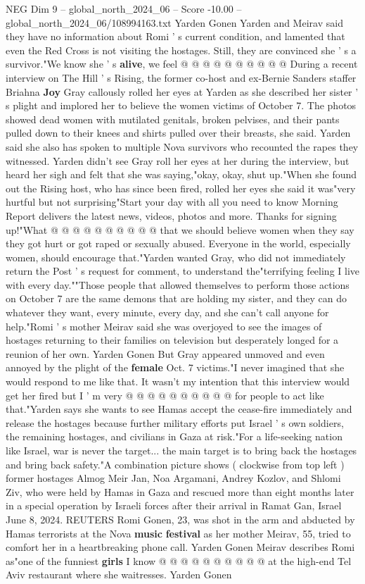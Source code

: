 \begin{textsample}{NEG Dim 9 – global\_north\_2024\_06 – Score -10.00 – global\_north\_2024\_06/108994163.txt}
Yarden Gonen Yarden and Meirav said they have no information about Romi ' s current condition, and lamented that even the Red Cross is not visiting the hostages.
Still, they are convinced she ' s a survivor."We know she ' s \textbf{alive}, we feel @ @ @ @ @ @ @ @ @ @ During a recent interview on The Hill ' s Rising, the former co-host and ex-Bernie Sanders staffer Briahna \textbf{Joy} Gray callously rolled her eyes at Yarden as she described her sister ' s plight and implored her to believe the women victims of October 7.
The photos showed dead women with mutilated genitals, broken pelvises, and their pants pulled down to their knees and shirts pulled over their breasts, she said.
Yarden said she also has spoken to multiple Nova survivors who recounted the rapes they witnessed.
Yarden didn't see Gray roll her eyes at her during the interview, but heard her sigh and felt that she was saying,"okay, okay, shut up."When she found out the Rising host, who has since been fired, rolled her eyes she said it was"very hurtful but not surprising"Start your day with all you need to know Morning Report delivers the latest news, videos, photos and more.
Thanks for signing up!"What @ @ @ @ @ @ @ @ @ @ that we should believe women when they say they got hurt or got raped or sexually abused.
Everyone in the world, especially women, should encourage that."Yarden wanted Gray, who did not immediately return the Post ' s request for comment, to understand the"terrifying feeling I live with every day.""Those people that allowed themselves to perform those actions on October 7 are the same demons that are holding my sister, and they can do whatever they want, every minute, every day, and she can't call anyone for help."Romi ' s mother Meirav said she was overjoyed to see the images of hostages returning to their families on television but desperately longed for a reunion of her own.
Yarden Gonen But Gray appeared unmoved and even annoyed by the plight of the \textbf{female} Oct. 7 victims."I never imagined that she would respond to me like that.
It wasn't my intention that this interview would get her fired but I ' m very @ @ @ @ @ @ @ @ @ @ for people to act like that."Yarden says she wants to see Hamas accept the cease-fire immediately and release the hostages because further military efforts put Israel ' s own soldiers, the remaining hostages, and civilians in Gaza at risk."For a life-seeking nation like Israel, war is never the target... the main target is to bring back the hostages and bring back safety."A combination picture shows ( clockwise from top left ) former hostages Almog Meir Jan, Noa Argamani, Andrey Kozlov, and Shlomi Ziv, who were held by Hamas in Gaza and rescued more than eight months later in a special operation by Israeli forces after their arrival in Ramat Gan, Israel June 8, 2024.
REUTERS Romi Gonen, 23, was shot in the arm and abducted by Hamas terrorists at the Nova \textbf{music} \textbf{festival} as her mother Meirav, 55, tried to comfort her in a heartbreaking phone call.
Yarden Gonen Meirav describes Romi as"one of the funniest \textbf{girls} I know @ @ @ @ @ @ @ @ @ @ at the high-end Tel Aviv restaurant where she waitresses.
Yarden Gonen


\end{textsample}

